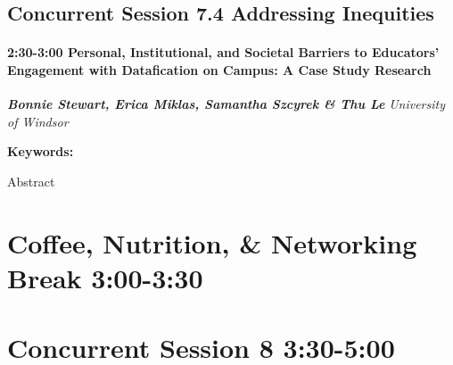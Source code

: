 \documentclass[
]{book}
\begin{document}
\hypertarget{concurrent-session-7.4-addressing-inequities}{%
\subsection*{Concurrent Session 7.4 \textbar{} Addressing Inequities}\label{concurrent-session-7.4-addressing-inequities}}

\begin{session}
\hypertarget{personal-institutional-and-societal-barriers-to-educators-engagement-with-datafication-on-campus-a-case-study-research}{%
\paragraph*{\texorpdfstring{2:30-3:00 \textbar{} \textbf{Personal,
Institutional, and Societal Barriers to Educators' Engagement with
Datafication on Campus: A Case Study} \textbar{}
Research}{2:30-3:00 \textbar{} Personal, Institutional, and Societal Barriers to Educators' Engagement with Datafication on Campus: A Case Study \textbar{} Research}}\label{personal-institutional-and-societal-barriers-to-educators-engagement-with-datafication-on-campus-a-case-study-research}}

\textbf{\emph{Bonnie Stewart, Erica Miklas, Samantha Szcyrek \& Thu Le}}
\textbar{} \emph{University of Windsor}

\textbf{Keywords:}

Abstract
\end{session}

\hypertarget{coffee-nutrition-networking-break-300-330-1}{%
\section*{Coffee, Nutrition, \& Networking Break \textbar{} 3:00-3:30}\label{coffee-nutrition-networking-break-300-330-1}}

\hypertarget{concurrent-session-8-330-500}{%
\section*{Concurrent Session 8 \textbar{} 3:30-5:00}\label{concurrent-session-8-330-500}}
\end{document}
